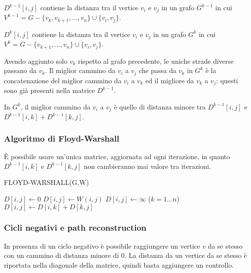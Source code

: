 \documentclass[11pt]{book}
\begin{document}
$D^{k-1}[i,j]$ contiene la distanza tra il vertice $v_i$ e $v_j$ in un grafo $G^{k-1}$ in cui 
$V^{k-1}=G-\{v_k,v_{k+1},\dots,v_n\}\cup\{v_i,v_j\}$. 

$D^k[i,j]$ contiene la distanza tra il vertice $v_i$ e $v_j$ in un grafo $G^k$ in cui 
$V^k=G-\{v_{k+1},\dots,v_n\}\cup\{v_i,v_j\}$.

Avendo aggiunto solo $v_k$ rispetto al grafo precedente, le uniche strade diverse passano da $v_k$. Il miglior cammino da 
$v_i$ a $v_j$ che passa da $v_k$ in $G^k$ è la concatenazione del miglior cammino da $v_i$ a $v_k$ ed il migliore da $v_k$
a $v_j$: questi sono già presenti nella matrice $D^{k-1}$.

In $G^k$, il miglior cammino da $v_i$ a $v_j$ è quello di distanza minore tra $D^{k-1}[i,j]$ e $D^{k-1}[i,k]+D^{k-1}[k,j]$.
\subsubsection{Algoritmo di Floyd-Warshall}
È possibile usare un'unica matrice, aggiornata ad ogni iterazione, in quanto $D^{k-1}[i,k]$ e $D^{k-1}[k,j]$ non cambieranno 
mai valore tra iterazioni.
\begin{algorithm}
    \caption{FLOYD-WARSHALL(G,W)}
    \begin{algorithmic}
                    \State $D[i,j]\gets 0$
                    \State $D[i,j]\gets W(i,j)$
                \Else
                    \State $D[i,j]\gets \infty$
                \EndIf 
            \EndFor 
        \EndFor 
        \For($k=1\dots n$) 
                        \State $D[i,j]\gets D[i,k]+D[k,j]$
                    \EndIf 
                \EndFor 
            \EndFor 
        \EndFor 
    \end{algorithmic}
\end{algorithm}
\subsubsection{Cicli negativi e path reconstruction}
In presenza di un ciclo negativo è possibile raggiungere un vertice $v$ da se stesso con un cammino di distanza minore di 0.
La distanza da un vertice da se stesso è riportata nella diagonale della matrice, quindi basta aggiungere un controllo.
\end{document}

